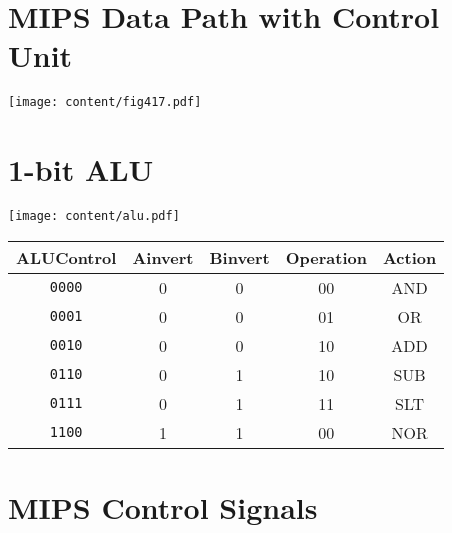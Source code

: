 \documentclass[11pt]{article}
\begin{document}
\begin{minipage}[t]{0.64\linewidth}
    \section*{MIPS Data Path with Control Unit}
    \centering
    \texttt{[image: content/fig417.pdf]}
\end{minipage}
\begin{minipage}[t]{0.35\linewidth}
    \section*{1-bit ALU}
    \texttt{[image: content/alu.pdf]}
    \begin{center}
        \begin{tabular}[t]{c|ccc|c}
            \toprule
            ALUControl & Ainvert & Binvert & Operation & Action \\
            \midrule
            {\tt 0000} & 0       & 0       & 00        & AND    \\
            {\tt 0001} & 0       & 0       & 01        & OR     \\
            {\tt 0010} & 0       & 0       & 10        & ADD    \\
            {\tt 0110} & 0       & 1       & 10        & SUB    \\
            {\tt 0111} & 0       & 1       & 11        & SLT    \\
            {\tt 1100} & 1       & 1       & 00        & NOR    \\
            \bottomrule
        \end{tabular}
    \end{center}
\end{minipage}

\vfill

\begin{minipage}[t]{\linewidth}
    \section*{MIPS Control Signals}

    \begin{minipage}[t]{0.28\textwidth}
        
    \end{minipage}
    \begin{minipage}[t]{0.64\textwidth}
        
    \end{minipage}
\end{minipage}
\end{document}
